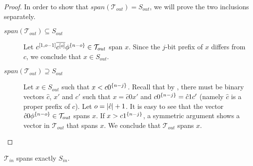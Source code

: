 \begin{proof}
In order to show that
$span(\mathcal{T}_{out}) = S_{out}$,
we will prove the two inclusions separately.

\begin{description}
\item[$span(\mathcal{T}_{out}) \subseteq S_{out}$]
Let $c^{[1, o-1]} \overline{c^{[o]}} \phi^{\{n-o\}}
\in \mathcal{T}_{out}$
span $x$.
Since the $j$-bit prefix of $x$ differs from $c$,
we conclude that $x \in S_{out}$.

\item[$span(\mathcal{T}_{out}) \supseteq S_{out}$]
Let $x \in S_{out}$ such that $x < c 0^{\{n-j\}}$.
Recall that by ,
there must be binary vectors $\hat{c}$, $x'$ and $c'$
such that $x = \hat{c} 0 x'$
and $c 0^{\{n-j\}} = \hat{c} 1 c'$
(namely $\hat{c}$ is a proper prefix of $c$).
Let $o = \lvert\hat{c}\rvert + 1$.
It is easy to see that the vector
$\hat{c} 0 \phi^{\{n-o\}} \in \mathcal{T}_{out}$
spans $x$.
If $x > c 1^{\{n-j\}}$,
a symmetric argument shows a vector in $\mathcal{T}_{out}$
that spans $x$.
We conclude that $\mathcal{T}_{out}$ spans $x$.
\end{description}
\end{proof}

\begin{lemma}
$\mathcal{T}_{in}$ spans exactly $S_{in}$.
\end{lemma}

